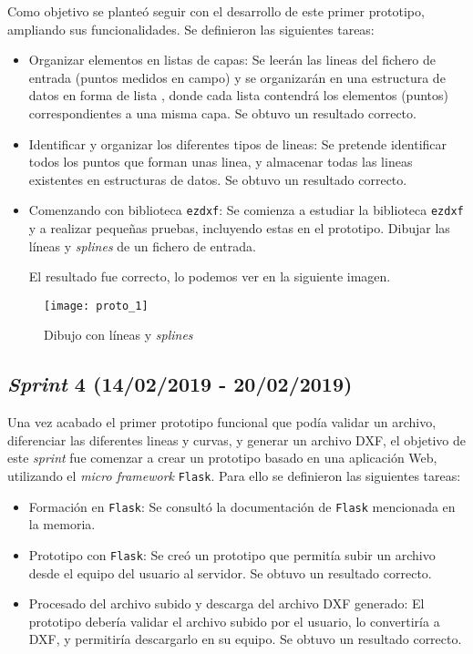 Como objetivo se planteó seguir con el desarrollo de este primer prototipo, ampliando sus funcionalidades. Se definieron las siguientes tareas:

\begin{itemize}
\item Organizar elementos en listas de capas: Se leerán las lineas del fichero de entrada (puntos medidos en campo) y se organizarán en una estructura de datos en forma de lista , donde cada lista contendrá los elementos (puntos) correspondientes a una misma capa. Se obtuvo un resultado correcto.
\item Identificar y organizar los diferentes tipos de lineas: Se pretende identificar todos los puntos que forman unas linea, y almacenar todas las lineas existentes en estructuras de datos. Se obtuvo un resultado correcto.
\item Comenzando con biblioteca \texttt{ezdxf}: Se comienza a estudiar la biblioteca \texttt{ezdxf} y a realizar pequeñas pruebas, incluyendo estas en el prototipo. Dibujar las líneas y \emph{splines} de un fichero de entrada.

El resultado fue correcto, lo podemos ver en la siguiente imagen.

\end{itemize}

\begin{figure}[H]
	\centering
	\texttt{[image: proto\_1]}
	\caption{Dibujo con líneas y \emph{splines}}
	\label{fig:proto_1}
\end{figure}


\subsection{\emph{Sprint} 4 (14/02/2019 - 20/02/2019)}

Una vez acabado el primer prototipo funcional que podía validar un archivo, diferenciar las diferentes lineas y curvas, y generar un archivo DXF, el objetivo de este \emph{sprint} fue comenzar a crear un prototipo  basado en una aplicación Web, utilizando el \emph{micro framework} \texttt{Flask}. Para ello se definieron las siguientes tareas:

\begin{itemize}
\item Formación en \texttt{Flask}: Se consultó la documentación de \texttt{Flask} mencionada en la memoria.

\item Prototipo con \texttt{Flask}: Se creó un prototipo que permitía subir un archivo desde el equipo del usuario al servidor. Se obtuvo un resultado correcto.

\item Procesado del archivo subido y descarga del archivo DXF generado: El prototipo debería validar el archivo subido por el usuario, lo convertiría a DXF, y permitiría descargarlo en su equipo. Se obtuvo un resultado correcto.

\end{itemize}
 
